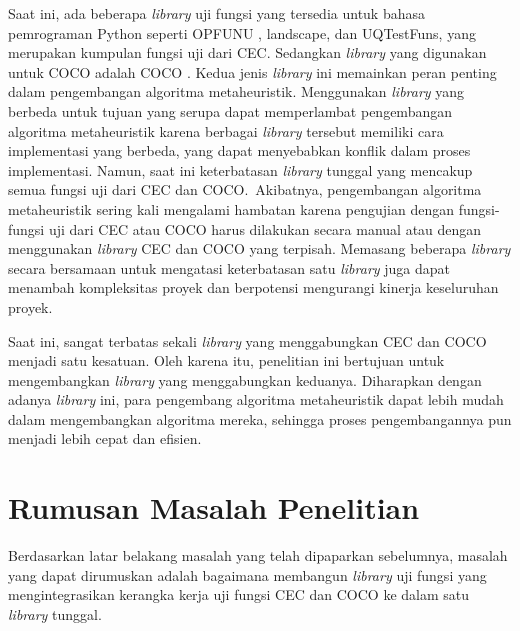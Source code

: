 Saat ini, ada beberapa \textit{library} uji fungsi yang tersedia untuk bahasa pemrograman Python seperti OPFUNU \citep{Van_Thieu_2024}, landscape, dan UQTestFuns, yang merupakan kumpulan fungsi uji dari CEC. Sedangkan \textit{library} yang digunakan untuk COCO adalah COCO \citep{pro_1999}. Kedua jenis \textit{library} ini memainkan peran penting dalam pengembangan algoritma metaheuristik. Menggunakan \textit{library} yang berbeda untuk tujuan yang serupa dapat memperlambat pengembangan algoritma metaheuristik karena berbagai \textit{library} tersebut memiliki cara implementasi yang berbeda, yang dapat menyebabkan konflik dalam proses implementasi. Namun, saat ini keterbatasan \textit{library} tunggal yang mencakup semua fungsi uji dari CEC dan COCO.\ Akibatnya, pengembangan algoritma metaheuristik sering kali mengalami hambatan karena pengujian dengan fungsi-fungsi uji dari CEC atau COCO harus dilakukan secara manual atau dengan menggunakan \textit{library} CEC dan COCO yang terpisah. Memasang beberapa \textit{library} secara bersamaan untuk mengatasi keterbatasan satu \textit{library} juga dapat menambah kompleksitas proyek dan berpotensi mengurangi kinerja keseluruhan proyek.

Saat ini, sangat terbatas sekali \textit{library} yang menggabungkan CEC dan COCO menjadi satu kesatuan. Oleh karena itu, penelitian ini bertujuan untuk mengembangkan \textit{library} yang menggabungkan keduanya. Diharapkan dengan adanya \textit{library} ini, para pengembang algoritma metaheuristik dapat lebih mudah dalam mengembangkan algoritma mereka, sehingga proses pengembangannya pun menjadi lebih cepat dan efisien.

\section{Rumusan Masalah Penelitian}
Berdasarkan latar belakang masalah yang telah dipaparkan sebelumnya, masalah yang dapat dirumuskan adalah bagaimana membangun \textit{library} uji fungsi yang mengintegrasikan kerangka kerja uji fungsi CEC dan COCO ke dalam satu \textit{library} tunggal.


